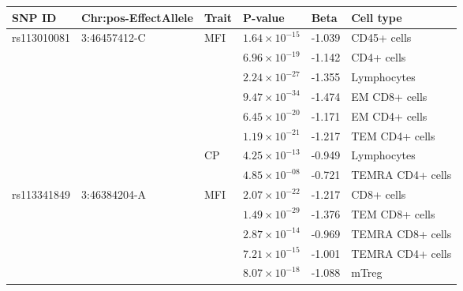 \documentclass{book}
\begin{document}
\begin{refsection}
\begin{table}[H] %
  \scriptsize
  \begin{tabular}{llllll}
    \hline
    SNP ID                        &  Chr:pos-EffectAllele          &  Trait               & P-value  & Beta   & Cell type \\
    \hline
    \multirow{8}{*}{rs113010081}  & \multirow{8}{*}{3:46457412-C}  & \multirow{6}{*}{MFI} & $1.64 \times 10^{-15}$ & -1.039 & CD45+ cells \\
                                  &                                &                      & $6.96 \times 10^{-19}$ & -1.142 & CD4+ cells \\
                                  &                                &                      & $2.24 \times 10^{-27}$ & -1.355 & Lymphocytes \\
                                  &                                &                      & $9.47 \times 10^{-34}$ & -1.474 & EM CD8+ cells  \\
                                  &                                &                      & $6.45 \times 10^{-20}$ & -1.171 & EM CD4+ cells  \\
                                  &                                &                      & $1.19 \times 10^{-21}$ & -1.217 & TEM CD4+ cells \\
    \cline{3-6}
                                  &                                & \multirow{2}{*}{CP}  & $4.25 \times 10^{-13}$ & -0.949 & Lymphocytes \\
                                  &                                &                      & $4.85 \times 10^{-08}$ & -0.721 & TEMRA CD4+ cells \\
    \hline
    \multirow{13}{*}{rs113341849} & \multirow{13}{*}{3:46384204-A} & \multirow{5}{*}{MFI} & $2.07 \times 10^{-22}$ & -1.217 & CD8+ cells \\
                                  &                                &                      & $1.49 \times 10^{-29}$ & -1.376 & TEM CD8+ cells \\
                                  &                                &                      & $2.87 \times 10^{-14}$ & -0.969 & TEMRA CD8+ cells \\
                                  &                                &                      & $7.21 \times 10^{-15}$ & -1.001 & TEMRA CD4+ cells \\
                                  &                                &                      & $8.07 \times 10^{-18}$ & -1.088 & mTreg \\

\end{tabular}
\end{table}
\end{refsection}
\end{document}
